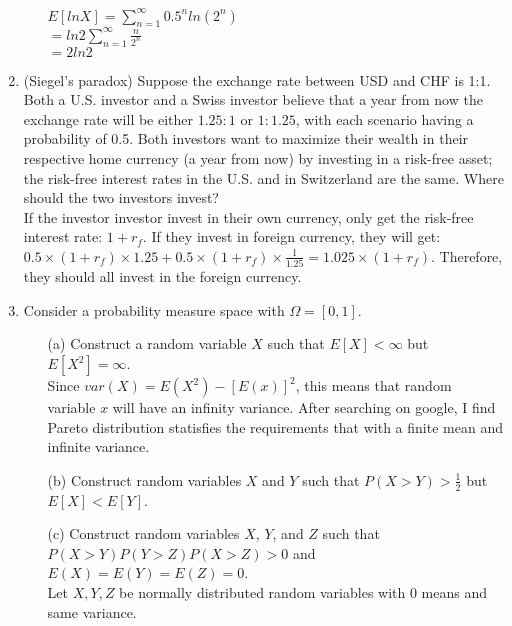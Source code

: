 \documentclass[letterpaper,12pt]{article}
\theoremstyle{definition}
\begin{document}
\begin{enumerate}
\begin{itemize}
			$E[ln X] = \sum_{n = 1}^{\infty} 0.5^nln(2^n)$\\
			$= ln2\sum_{n = 1}^{\infty} \frac{n}{2^n}$\\
			$= 2ln2$
		\end{itemize}
	
	\item (Siegel's paradox) Suppose the exchange rate between USD and CHF is 1:1. Both a U.S. investor and a Swiss investor believe that a year from now the exchange rate will be either $1.25:1$ or $1:1.25$, with each scenario having a probability of 0.5. Both investors want to maximize their wealth in their respective home currency (a year from now) by investing in a risk-free asset; the risk-free interest rates in the U.S. and in Switzerland are the same. Where should the two investors invest?\\
		
	If the investor investor invest in their own currency, only get the risk-free interest rate: $1 + r_f$. If they invest in foreign currency, they will get: $0.5 \times (1 + r_f) \times 1.25 + 0.5 \times (1 + r_f) \times \frac{1}{1.25} = 1.025 \times (1 + r_f)$. Therefore, they should all invest in the foreign currency.

\item Consider a probability measure space with $\Omega = [0,1]$.
		\begin{itemize}
			\item[(a)] Construct a random variable $X$ such that $E[X] < \infty$ but $E[X^2] = \infty$.\\
			Since $var(X) = E(X^2) - [E(x)]^2$, this means that random variable $x$ will have an infinity variance. After searching on google, I find Pareto distribution statisfies the requirements that with a finite mean and infinite variance. \\

			\item[(b)] Construct random variables $X$ and $Y$ such that $P(X>Y)>\frac{1}{2}$ but $E[X]<E[Y]$.\\
			
			
			\item[(c)] Construct random variables $X$, $Y$, and $Z$ such that\\ $P(X>Y) P(Y>Z) P(X>Z) > 0$ and 						$E(X)=E(Y)=E(Z)=0$.\\
			
			Let $X, Y, Z$ be normally distributed random variables with $0$ means and same variance.
		\end{itemize}


\end{enumerate}
\end{document}

